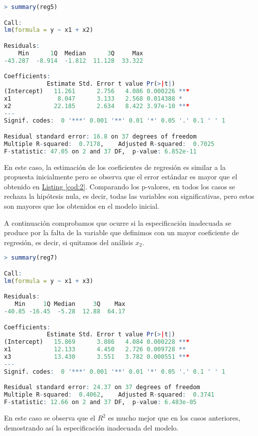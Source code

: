 \documentclass[12pt,a4paper]{article}
\begin{document}
\begin{lstlisting}[language=R, caption = Especificación inadecuada del modelo, label =cod:6]
> summary(reg5)  

Call:
lm(formula = y ~ x1 + x2)

Residuals:
    Min      1Q  Median      3Q     Max 
-43.287  -8.914  -1.812  11.128  33.322 

Coefficients:
            Estimate Std. Error t value Pr(>|t|)    
(Intercept)   11.261      2.756   4.086 0.000226 ***
x1             8.047      3.133   2.568 0.014388 *  
x2            22.185      2.634   8.422 3.97e-10 ***
---
Signif. codes:  0 '***' 0.001 '**' 0.01 '*' 0.05 '.' 0.1 ' ' 1

Residual standard error: 16.8 on 37 degrees of freedom
Multiple R-squared:  0.7178,	Adjusted R-squared:  0.7025 
F-statistic: 47.05 on 2 and 37 DF,  p-value: 6.852e-11
\end{lstlisting}
En este caso, la estimación de los coeficientes de regresión es similar a la propuesta inicialmente pero se observa que el error estándar es mayor que el obtenido en \hyperref[cod:2]{Listing \ref{cod:2}}. Comparando los p-valores, en todos los casos se rechaza la hipótesis nula, es decir, todas las variables son significativas, pero estos son mayores que los obtenidos en el modelo inicial.

A continuación comprobamos que ocurre si la especificación inadecuada se produce por la falta de la variable que definimos con un mayor coeficiente de regresión, es decir, si quitamos del análisis $x_2$.

\begin{lstlisting}[language=R, caption = Especificación inadecuada del modelo, label =cod:7]
> summary(reg7)

Call:
lm(formula = y ~ x1 + x3)

Residuals:
   Min     1Q Median     3Q    Max 
-40.85 -16.45  -5.28  12.88  64.17 

Coefficients:
            Estimate Std. Error t value Pr(>|t|)    
(Intercept)   15.869      3.886   4.084 0.000228 ***
x1            12.133      4.450   2.726 0.009728 ** 
x3            13.430      3.551   3.782 0.000551 ***
---
Signif. codes:  0 '***' 0.001 '**' 0.01 '*' 0.05 '.' 0.1 ' ' 1

Residual standard error: 24.37 on 37 degrees of freedom
Multiple R-squared:  0.4062,	Adjusted R-squared:  0.3741 
F-statistic: 12.66 on 2 and 37 DF,  p-value: 6.483e-05
\end{lstlisting}
En este caso se observa que el $R^2$ es mucho mejor que en los casos anteriores, demostrando así la especificación inadecuada del modelo.
\end{document}
